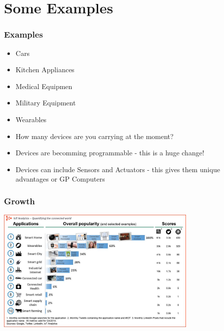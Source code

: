 \documentclass{beamer}
\begin{document}
 \section{Some Examples}
\begin{frame}
	\frametitle{Examples}
	
     \begin{itemize}
     	\item Cars
     	\item Kitchen Appliances
     	\item Medical Equipmen
     	\item Military Equipment
     	\item Wearables
     \end{itemize}
     
\begin{itemize}
	\item How many devices are you carrying at the moment?
     
     \item Devices are becomming programmable - this is a huge change!
     
     \item Devices can include Sensors and Actuators - this gives them unique advantages or GP Computers
\end{itemize}
\end{frame}


\begin{frame}
	\frametitle{Growth}
	\includegraphics[height=6cm]{deviceApps.jpg}
	
\end{frame}
\end{document}
